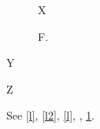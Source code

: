 \documentclass{article}
\begin{document}
\begin{figure}X\caption{F.}\label{f}\end{figure}
\begin{listing}[H]
Y\caption{Code one.}\label{l}
\end{listing}
\begin{listing}
Z\caption{Code two.}\label{l2}
\end{listing}
See \ref{l}, \autoref{l2}, \cref{l}, , \ref{f}.
\listoflistings
\end{document}
